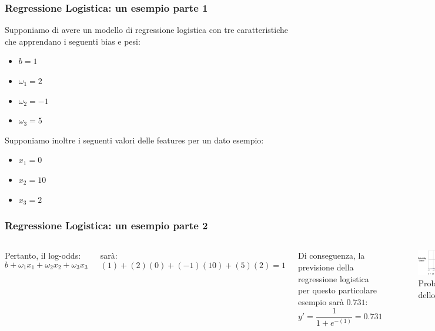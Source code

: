 \begin{frame}
	
	\frametitle{Regressione Logistica: un esempio parte 1}
	
	Supponiamo di avere un modello di regressione logistica con tre caratteristiche che apprendano i seguenti bias e pesi:
	\begin{itemize}
		\item $b = 1$
		\item $\omega_1 = 2$
		\item $\omega_2 = -1$
		\item $\omega_3 = 5$
	\end{itemize}
	
	Supponiamo inoltre i seguenti valori delle features per un dato esempio:
	\begin{itemize}
		\item $x_1 = 0$
		\item $x_2 = 10$
		\item $x_3 = 2$
	\end{itemize}
	
\end{frame}


\begin{frame}
	
	\frametitle{Regressione Logistica: un esempio parte 2}

	\begin{columns}
		Pertanto, il log-odds:
		$$b + \omega_1x_1 + \omega_2x_2 + \omega_3x_3$$
	
		sarà:
		$$(1) + (2)(0) + (-1)(10) + (5)(2) = 1$$	
		
		Di conseguenza, la previsione della regressione logistica per questo particolare esempio sarà $0.731$:
		$$y' = \frac{1}{1 + e^{-(1)}} = 0.731$$
		
		\begin{figure}[!htbp]
			\centering
			\includegraphics[width=1.0\linewidth]{images/supervised/z_algoritms_logistic_regression/LogisticRegressionOutput0_731.png}
			\caption{Probabilità dello 0.731}
		\end{figure}
	\end{columns}
	
\end{frame}


